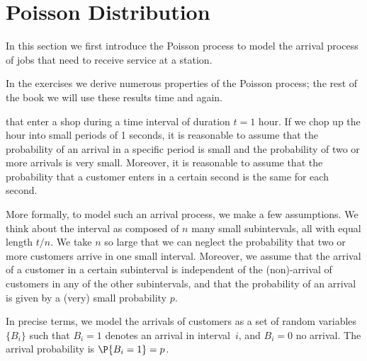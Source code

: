 


\section{Poisson Distribution}
\label{sec:poisson-distribution}

In this section we first introduce the Poisson process to model the arrival process of jobs
that need to receive service at a station.

In the exercises we derive numerous properties of the Poisson process; the rest of the book we will use these results time and again.



 that enter a shop during a time interval of duration $t=1$ hour.
If we chop up the hour into small periods of 1 seconds, it is reasonable to assume that the probability of an arrival in a specific period is small and the probability of two or more arrivals is very small.
Moreover, it is reasonable to assume that the probability that a customer enters in a certain second is the same for each second.

More formally, to model such an arrival process, we make a few assumptions.
We think about the interval as composed of $n$ many small subintervals, all with equal length $t/n$.
We take $n$  so large that we can neglect the probability that two or more customers arrive in one small interval.
Moreover, we assume that the arrival of a customer in a certain subinterval is independent of the (non)-arrival of customers in any of the other subintervals, and that the probability of an arrival is given by a (very) small probability $p$.

In precise terms, we model the arrivals of customers as a set of   random variables $\{B_i\}$  such that $B_i=1$ denotes an arrival in interval~$i$, and $B_i=0$ no arrival.  The arrival probability is $\P{B_i =1}=p$.

